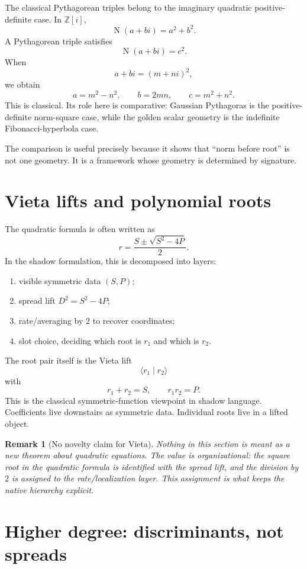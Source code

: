 \documentclass[11pt]{article}
\newtheorem{remark}[definition]{Remark}
\newcommand{\Nm}{\operatorname{N}}
\newcommand{\Z}{\mathbb{Z}}
\begin{document}
The classical Pythagorean triples belong to the imaginary quadratic positive-definite case.  In $\Z[i]$,
\[
    \Nm(a+bi)=a^2+b^2.
\]
A Pythagorean triple satisfies
\[
    \Nm(a+bi)=c^2.
\]
When
\[
    a+bi=(m+ni)^2,
\]
we obtain
\[
    a=m^2-n^2,
    \qquad
    b=2mn,
    \qquad
    c=m^2+n^2.
\]
This is classical.  Its role here is comparative: Gaussian Pythagoras is the positive-definite norm-square case, while the golden scalar geometry is the indefinite Fibonacci-hyperbola case.

The comparison is useful precisely because it shows that ``norm before root'' is not one geometry.  It is a framework whose geometry is determined by signature.

\section{Vieta lifts and polynomial roots}

The quadratic formula is often written as
\[
    r=\frac{S\pm\sqrt{S^2-4P}}{2}.
\]
In the shadow formulation, this is decomposed into layers:

\begin{enumerate}[label=(\roman*)]
    \item visible symmetric data $(S,P)$;
    \item spread lift $D^2=S^2-4P$;
    \item rate/averaging by $2$ to recover coordinates;
    \item slot choice, deciding which root is $r_1$ and which is $r_2$.
\end{enumerate}

The root pair itself is the Vieta lift
\[
    \langle r_1\mid r_2\rangle
\]
with
\[
    r_1+r_2=S,
    \qquad
    r_1r_2=P.
\]
This is the classical symmetric-function viewpoint in shadow language.  Coefficients live downstairs as symmetric data.  Individual roots live in a lifted object.

\begin{remark}[No novelty claim for Vieta]
Nothing in this section is meant as a new theorem about quadratic equations.  The value is organizational: the square root in the quadratic formula is identified with the spread lift, and the division by $2$ is assigned to the rate/localization layer.  This assignment is what keeps the native hierarchy explicit.
\end{remark}

\section{Higher degree: discriminants, not spreads}
\end{document}
